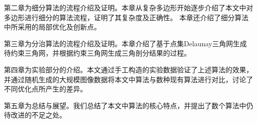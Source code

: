 第二章为细分算法的流程介绍及证明。本章从复杂多边形开始逐步介绍了本文中对多边形进行细分的算法流程，证明了其复杂度及正确性。
本章还介绍了细分算法中所采用的局部优化及创新点。

第三章为分治算法的流程介绍及证明。本章介绍了基于点集Delaunay三角网生成待约束三角网，并根据约束三角网生成三角剖分结果的过程。

第四章为实验部分的介绍。本文通过手工构造的实验数据验证了上述算法的效果，并通过随机生成的大规模图像数据将本文中算法与数种现有算法进行对比，讨论了不同优化点所产生的差异。

第五章为总结与展望。我们总结了本文中算法的核心特点，并提出了数个算法中仍待改进的不足之处。











